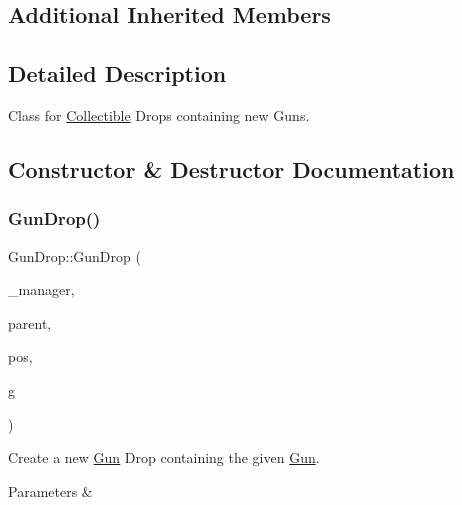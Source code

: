 \subsection*{Additional Inherited Members}


\subsection{Detailed Description}
Class for \mbox{\hyperlink{class_collectible}{Collectible}} Drops containing new Guns. 

\subsection{Constructor \& Destructor Documentation}
\mbox{\label{class_gun_drop_a0c55c4a40bababe650204ca9d004e43e}} 
\subsubsection{\texorpdfstring{GunDrop()}{GunDrop()}\hspace{0.1cm}{\footnotesize\ttfamily [1/2]}}
{\footnotesize\ttfamily Gun\+Drop\+::\+Gun\+Drop (\begin{DoxyParamCaption}\item[{\mbox{\hyperlink{class_game_manager}{Game\+Manager}} $\ast$}]{\+\_\+manager,  }\item[{\mbox{\hyperlink{class_game_entity}{Game\+Entity}} $\ast$}]{parent,  }\item[{\mbox{\hyperlink{classsf_1_1_vector2}{sf\+::\+Vector2f}}}]{pos,  }\item[{\mbox{\hyperlink{class_gun}{Gun}} $\ast$}]{g }\end{DoxyParamCaption})}



Create a new \mbox{\hyperlink{class_gun}{Gun}} Drop containing the given \mbox{\hyperlink{class_gun}{Gun}}. 


\begin{DoxyParams}{Parameters}
{\em } & \\
\hline
\end{DoxyParams}
\mbox{\label{class_gun_drop_abf97e26fbd4dda8c7143128e0ecd0981}} 
